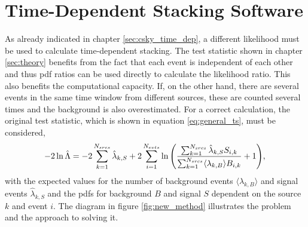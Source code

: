 \chapter{Time-Dependent Stacking Software} \label{sec:tdepps}

As already indicated in chapter \ref{sec:csky_time_dep}, a different likelihood must be used to calculate time-dependent stacking.
The test statistic shown in chapter \ref{sec:theory} benefits from the fact that each event is independent of each other and thus pdf ratios can be used directly to calculate the likelihood ratio.
This also benefits the computational capacity.
If, on the other hand, there are several events in the same time window from different sources, these are counted several times and the background is also overestimated.
For a correct calculation, the original test statistic, which is shown in equation \eqref{eq:general_ts}, must be considered,
\begin{equation}
    -2\ln{\hat{\Lambda}} = -2\sum_{k=1}^{N_{srcs}}\hat{\lambda}_{k,S} + 2\sum_{i=1}^{N_{evts}}\ln{\left(\frac{\sum_{k=1}^{N_{srcs}}\hat{\lambda}_{k,S}S_{i,k}}{\sum_{k=1}^{N_{srcs}}\langle\lambda_{k,B}\rangle B_{i,k}}+1\right)} \label{eq:general_ts}, \\
\end{equation}
with the expected values for the number of background events $\langle\lambda_{k,B}\rangle$ and signal events  $\hat{\lambda}_{k,S}$ and the pdfs for background $B$ and signal $S$ dependent on the source $k$ and event $i$.
The diagram in figure \ref{fig:new_method} illustrates the problem and the approach to solving it.

